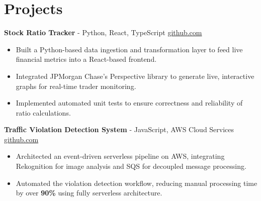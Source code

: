 \documentclass[11pt]{article}       %
\begin{document}
\vspace{-18.5pt}

\section*{Projects}

\textbf{Stock Ratio Tracker}{ - Python, React, TypeScript} \hfill \href{https://github.com/Monica20030707/Trading-Dashboard_UI}{github.com} \\
\vspace{-9pt}
\begin{itemize}
  \item Built a Python-based data ingestion and transformation layer to feed live financial metrics into a React-based frontend.
  \item Integrated JPMorgan Chase's Perspective library to generate live, interactive graphs for real-time trader monitoring.
  \item Implemented automated unit tests to ensure correctness and reliability of ratio calculations.
\end{itemize}

\textbf{Traffic Violation Detection System}{ - JavaScript, AWS Cloud Services} \hfill \href{https://github.com/Monica20030707/AWS_rekonigition-N-read-database}{github.com} \\
\vspace{-9pt}
\begin{itemize}
  \item Architected an event-driven serverless pipeline on AWS, integrating Rekognition for image analysis and SQS for decoupled message processing.
  \item Automated the violation detection workflow, reducing manual processing time by over \textbf{90\%} using fully serverless architecture.
\end{itemize}

\end{document}
